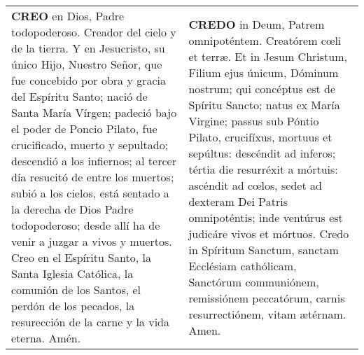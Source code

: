 \documentclass[./rosary.tex]{subfiles}
\begin{document}
\label{creed}
\begin{longtable} { p{} p{} }
    \textbf{CREO} en Dios, Padre todopoderoso. Creador del cielo y de la tierra. Y en Jesucristo, su único Hijo, Nuestro Señor,
    que fue concebido por obra y gracia del Espíritu Santo; nació de Santa María Vírgen; padeció bajo el poder de Poncio Pilato,
    fue crucificado, muerto y sepultado; descendió a los infiernos; al tercer día resucitó de entre los muertos; subió a los cielos,
    está sentado a la derecha de Dios Padre todopoderoso; desde allí ha de venir a juzgar a vivos y muertos.
    Creo en el Espíritu Santo, la Santa Iglesia Católica, la comunión de los Santos, el perdón de los pecados,
    la resurección de la carne y la vida eterna. Amén.
     &
    \textbf{CREDO} in Deum, Patrem omnipoténtem. Creatórem cœli et terræ. Et in Jesum Christum, Filium ejus únicum, Dóminum nostrum;
    qui concéptus est de Spíritu Sancto; natus ex María Virgine; passus sub Póntio Pilato, crucifíxus, mortuus et sepúltus:
    descéndit ad inferos; tértia die resurréxit a mórtuis: ascéndit ad cœlos, sedet ad dexteram Dei Patris omnipoténtis;
    inde ventúrus est judicáre vivos et mórtuos. Credo in Spíritum Sanctum, sanctam Ecclésiam cathólicam, Sanctórum communiónem,
    remissiónem peccatórum, carnis resurrectiónem, vitam ætérnam. Amen.
\end{longtable}
\end{document}

